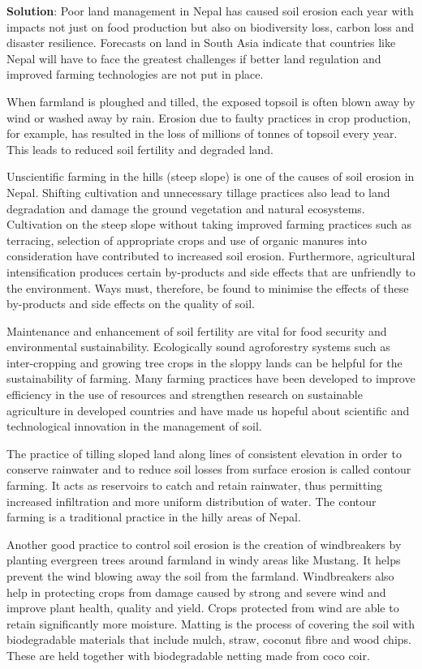 \documentclass[
  openany]{book}
\newenvironment{solution}{ {\bfseries Solution}:}{}
\begin{document}
\begin{questions}
\begin{solution}
Poor land management in Nepal has caused soil erosion each year with impacts not just on food production but also on biodiversity loss, carbon loss and disaster resilience. Forecasts on land in South Asia indicate that countries like Nepal will have to face the greatest challenges if better land regulation and improved farming technologies are not put in place.

When farmland is ploughed and tilled, the exposed topsoil is often blown away by wind or washed away by rain. Erosion due to faulty practices in crop production, for example, has resulted in the loss of millions of tonnes of topsoil every year. This leads to reduced soil fertility and degraded land.

Unscientific farming in the hills (steep slope) is one of the causes of soil erosion in Nepal. Shifting cultivation and unnecessary tillage practices also lead to land degradation and damage the ground vegetation and natural ecosystems. Cultivation on the steep slope without taking improved farming practices such as terracing, selection of appropriate crops and use of organic manures into consideration have contributed to increased soil erosion. Furthermore, agricultural intensification produces certain by-products and side effects that are unfriendly to the environment. Ways must, therefore, be found to minimise the effects of these by-products and side effects on the quality of soil.

Maintenance and enhancement of soil fertility are vital for food security and environmental sustainability. Ecologically sound agroforestry systems such as inter-cropping and growing tree crops in the sloppy lands can be helpful for the sustainability of farming. Many farming practices have been developed to improve efficiency in the use of resources and strengthen research on sustainable agriculture in developed countries and have made us hopeful about scientific and technological innovation in the management of soil.

The practice of tilling sloped land along lines of consistent elevation in order to conserve rainwater and to reduce soil losses from surface erosion is called contour farming. It acts as reservoirs to catch and retain rainwater, thus permitting increased infiltration and more uniform distribution of water. The contour farming is a traditional practice in the hilly areas of Nepal.

Another good practice to control soil erosion is the creation of windbreakers by planting evergreen trees around farmland in windy areas like Mustang. It helps prevent the wind blowing away the soil from the farmland. Windbreakers also help in protecting crops from damage caused by strong and severe wind and improve plant health, quality and yield. Crops protected from wind are able to retain significantly more moisture. Matting is the process of covering the soil with biodegradable materials that include mulch, straw, coconut fibre and wood chips. These are held together with biodegradable netting made from coco coir.


\end{solution}
\end{questions}
\end{document}
